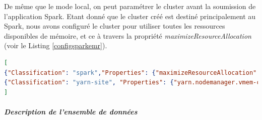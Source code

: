 \begin{table}[H]
	\centering
\caption{}
\label{clusters-description}
\end{table}
De même que le mode local, on peut paramétrer le cluster avant  la soumission de l'application Spark. Etant donné que le cluster créé est destiné principalement au Spark, nous avons configuré le cluster pour utiliser toutes les ressources disponibles de mémoire, et ce à travers la propriété \textit{maximizeResourceAllocation} (voir le Listing \ref{configsparkemr}).
\begin{lstlisting}[language=json, basicstyle=\small, label= configsparkemr, caption = Exemple de fichier de configuration d'un cluster Amazon EMR]
[
{"Classification": "spark","Properties": {"maximizeResourceAllocation": "true"} },
{"Classification": "yarn-site", "Properties": {"yarn.nodemanager.vmem-check-enabled": "false"}}
]
\end{lstlisting}

\subparagraph{Description de l'ensemble de données}



